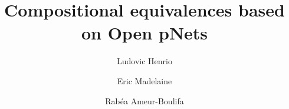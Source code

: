 \documentclass{lmcs}
\begin{document}
\title{Compositional equivalences based on Open pNets
}
\author{Ludovic Henrio}
\address{Univ Lyon, EnsL, UCBL, CNRS, Inria,  LIP, F-69342, LYON Cedex 07, France.}

\author{Eric Madelaine}
\address{INRIA Sophia Antipolis M\'edit\'erann\'ee, UCA, BP 93, 06902 Sophia Antipolis, France}
\author{Rab\'ea Ameur-Boulifa}
\address{LTCI, T\'el\'ecom Paris, Institut Polytechnique de Paris, France
}         

\end{document}
